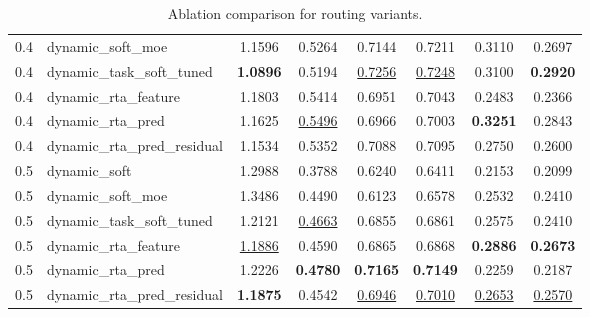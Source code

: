 \begin{table}[t]
\begin{tabular}{c l c c c c c c}
0.4 & dynamic_soft_moe & 1.1596 & 0.5264 & 0.7144 & 0.7211 & 0.3110 & 0.2697 \\ 
0.4 & dynamic_task_soft_tuned & \textbf{1.0896} & 0.5194 & \underline{0.7256} & \underline{0.7248} & 0.3100 & \textbf{0.2920} \\ 
0.4 & dynamic_rta_feature & 1.1803 & 0.5414 & 0.6951 & 0.7043 & 0.2483 & 0.2366 \\ 
0.4 & dynamic_rta_pred & 1.1625 & \underline{0.5496} & 0.6966 & 0.7003 & \textbf{0.3251} & 0.2843 \\ 
0.4 & dynamic_rta_pred_residual & 1.1534 & 0.5352 & 0.7088 & 0.7095 & 0.2750 & 0.2600 \\ 
0.5 & dynamic_soft & 1.2988 & 0.3788 & 0.6240 & 0.6411 & 0.2153 & 0.2099 \\ 
0.5 & dynamic_soft_moe & 1.3486 & 0.4490 & 0.6123 & 0.6578 & 0.2532 & 0.2410 \\ 
0.5 & dynamic_task_soft_tuned & 1.2121 & \underline{0.4663} & 0.6855 & 0.6861 & 0.2575 & 0.2410 \\ 
0.5 & dynamic_rta_feature & \underline{1.1886} & 0.4590 & 0.6865 & 0.6868 & \textbf{0.2886} & \textbf{0.2673} \\ 
0.5 & dynamic_rta_pred & 1.2226 & \textbf{0.4780} & \textbf{0.7165} & \textbf{0.7149} & 0.2259 & 0.2187 \\ 
0.5 & dynamic_rta_pred_residual & \textbf{1.1875} & 0.4542 & \underline{0.6946} & \underline{0.7010} & \underline{0.2653} & \underline{0.2570} \\ 
\bottomrule
\end{tabular}
\caption{Ablation comparison for routing variants.}
\label{tab:residual_ablation}
\end{table}
